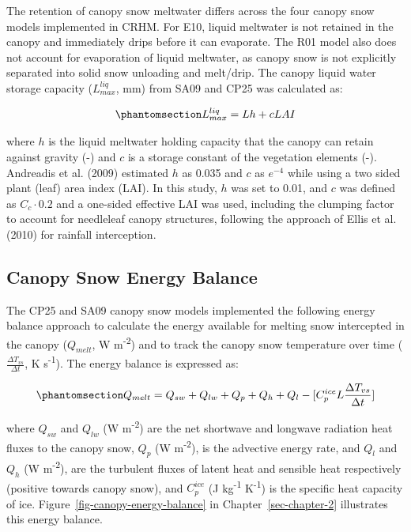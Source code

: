 \documentclass[
  letterpaper,
]{tex/uofsthesis-cs}
\begin{document}
The retention of canopy snow meltwater differs across the four canopy
snow models implemented in CRHM. For E10, liquid meltwater is not
retained in the canopy and immediately drips before it can evaporate.
The R01 model also does not account for evaporation of liquid meltwater,
as canopy snow is not explicitly separated into solid snow unloading and
melt/drip. The canopy liquid water storage capacity (\(L_{max}^{liq}\),
mm) from SA09 and CP25 was calculated as:

\begin{equation}\phantomsection\label{eq-liq-hold-cap}{
L_{max}^{liq} = Lh + cLAI
}\end{equation}

where \(h\) is the liquid meltwater holding capacity that the canopy can
retain against gravity (-) and \(c\) is a storage constant of the
vegetation elements (-). Andreadis et al. (2009) estimated \(h\) as
0.035 and \(c\) as \(e^{-4}\) while using a two sided plant (leaf) area
index (LAI). In this study, \(h\) was set to 0.01, and \(c\) was defined
as \(C_c \cdot 0.2\) and a one-sided effective LAI was used, including
the clumping factor to account for needleleaf canopy structures,
following the approach of Ellis et al. (2010) for rainfall interception.

\subsection{Canopy Snow Energy Balance}\label{sec-ebal}

The CP25 and SA09 canopy snow models implemented the following energy
balance approach to calculate the energy available for melting snow
intercepted in the canopy (\(Q_{melt}\), W m\textsuperscript{-2}) and to
track the canopy snow temperature over time
(\(\frac{\Delta T_{vs}}{\Delta t}\), K s\textsuperscript{-1}). The
energy balance is expressed as:

\begin{equation}\phantomsection\label{eq-eb}{
Q_{melt} = 
Q_{sw} +
Q_{lw} +
Q_{p} + Q_{h} + Q_{l} - [C_p^{ice} L \frac{\Delta T_{vs}}{\Delta t}]
}\end{equation}

where \(Q_{sw}\) and \(Q_{lw}\) (W m\textsuperscript{-2}) are the net
shortwave and longwave radiation heat fluxes to the canopy snow, \(Q_p\)
(W m\textsuperscript{-2}), is the advective energy rate, and \(Q_{l}\)
and \(Q_{h}\) (W m\textsuperscript{-2}), are the turbulent fluxes of
latent heat and sensible heat respectively (positive towards canopy
snow), and \(C_p^{ice}\) (J kg\textsuperscript{-1}
K\textsuperscript{-1}) is the specific heat capacity of ice.
Figure~\ref{fig-canopy-energy-balance} in Chapter~\ref{sec-chapter-2}
illustrates this energy balance.
\end{document}
